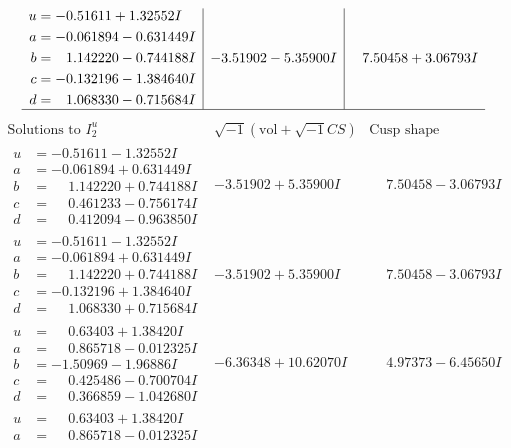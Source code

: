 \documentclass[1p]{elsarticle_modified}
\theoremstyle{definition}
\newcommand{\I}{\sqrt{-1}}
\begin{document}
$$\begin{array}{c|c|c}
\begin{aligned}
u &= -0.51611 + 1.32552 I \\
a &= -0.061894 - 0.631449 I \\
b &= \phantom{-}1.142220 - 0.744188 I \\
c &= -0.132196 - 1.384640 I \\
d &= \phantom{-}1.068330 - 0.715684 I\end{aligned}
 & -3.51902 - 5.35900 I & \phantom{-}7.50458 + 3.06793 I\\
 \hline 
 \end{array}$$\newpage$$\begin{array}{c|c|c}  
\text{Solutions to }I^u_{2}& \I (\text{vol} + \sqrt{-1}CS) & \text{Cusp shape}\\
 \hline 
\begin{aligned}
u &= -0.51611 - 1.32552 I \\
a &= -0.061894 + 0.631449 I \\
b &= \phantom{-}1.142220 + 0.744188 I \\
c &= \phantom{-}0.461233 - 0.756174 I \\
d &= \phantom{-}0.412094 - 0.963850 I\end{aligned}
 & -3.51902 + 5.35900 I & \phantom{-}7.50458 - 3.06793 I \\ \hline\begin{aligned}
u &= -0.51611 - 1.32552 I \\
a &= -0.061894 + 0.631449 I \\
b &= \phantom{-}1.142220 + 0.744188 I \\
c &= -0.132196 + 1.384640 I \\
d &= \phantom{-}1.068330 + 0.715684 I\end{aligned}
 & -3.51902 + 5.35900 I & \phantom{-}7.50458 - 3.06793 I \\ \hline\begin{aligned}
u &= \phantom{-}0.63403 + 1.38420 I \\
a &= \phantom{-}0.865718 - 0.012325 I \\
b &= -1.50969 - 1.96886 I \\
c &= \phantom{-}0.425486 - 0.700704 I \\
d &= \phantom{-}0.366859 - 1.042680 I\end{aligned}
 & -6.36348 + 10.62070 I & \phantom{-}4.97373 - 6.45650 I \\ \hline\begin{aligned}
u &= \phantom{-}0.63403 + 1.38420 I \\
a &= \phantom{-}0.865718 - 0.012325 I \\

\end{aligned}
\end{array}$$
\end{document}
